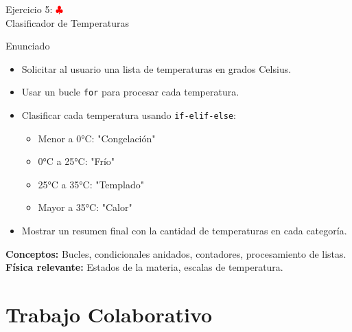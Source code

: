 \documentclass[10pt]{beamer}
\begin{document}
\begin{frame}{Ejercicio 5: \hfill \textcolor{red}{$\clubsuit$} \\ Clasificador de Temperaturas}
  \begin{block}{Enunciado}
    \begin{itemize}
      \item Solicitar al usuario una lista de temperaturas en grados Celsius.
      \item Usar un bucle \texttt{for} para procesar cada temperatura.
      \item Clasificar cada temperatura usando \texttt{if-elif-else}:
        \begin{itemize}
          \item Menor a 0°C: "Congelación"
          \item 0°C a 25°C: "Frío"
          \item 25°C a 35°C: "Templado"
          \item Mayor a 35°C: "Calor"
        \end{itemize}
      \item Mostrar un resumen final con la cantidad de temperaturas en cada categoría.
    \end{itemize}
  \end{block}
  
  \textbf{Conceptos:} Bucles, condicionales anidados, contadores, procesamiento de listas.
  \\
  \textbf{Física relevante:} Estados de la materia, escalas de temperatura.
\end{frame}

\section{Trabajo Colaborativo}
\end{document}
